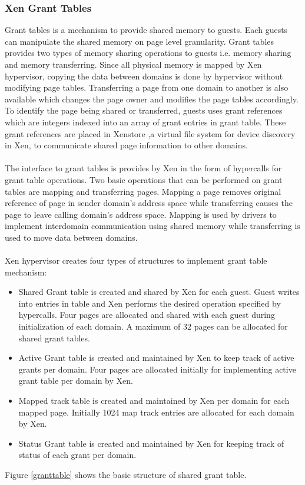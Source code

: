 \subsubsection{Xen Grant Tables\label{sec:granttables}}
Grant tables is a mechanism to provide shared memory to guests. Each guests can manipulate the shared memory on page level granularity. Grant tables provides two types of memory sharing operations to guests i.e. memory sharing and memory transferring. Since all physical memory is mapped by Xen hypervisor, copying the data between domains is done by hypervisor without modifying page tables. Transferring a page from one domain to another is also available which changes the page owner and modifies the page tables accordingly. To identify the page being shared or transferred, guests uses grant references which are integers indexed into an array of grant entries in grant table. These grant references are placed in Xenstore ,a virtual file system for device discovery in Xen, to communicate shared page information to other domains.
\\
\\
The interface to grant tables is provides by Xen in the form of hypercalls for grant table operations. Two basic operations that can be performed on grant tables are mapping and transferring pages. Mapping a page removes original reference of page in sender domain's address space while transferring causes the page to leave calling domain's address space. Mapping is used by drivers to implement interdomain communication using shared memory while transferring is used to move data between domains. 
\\
\\
Xen hypervisor creates four types of structures to implement grant table mechanism:
\begin{itemize}
	\item Shared Grant table is created and shared by Xen for each guest. Guest writes into entries in table and Xen performs the desired operation specified by hypercalls. Four pages are allocated and shared with each guest during initialization of each domain. A maximum of 32 pages can be allocated for shared grant tables.
	\item Active Grant table is created and maintained by Xen to keep track of active grants per domain. Four pages are allocated initially for implementing active grant table per domain by Xen.
	\item Mapped track table is created and maintained by Xen per domain for each mapped page. Initially 1024 map track entries are allocated for each domain by Xen.
	\item Status Grant table is created and maintained by Xen for keeping track of status of each grant per domain.
\end{itemize}
Figure \ref{granttable} shows the basic structure of shared grant table.


